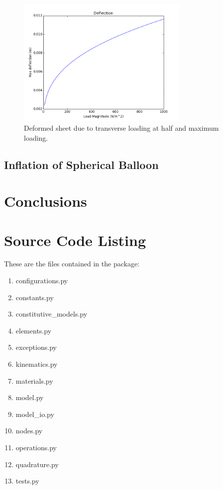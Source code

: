 \documentclass[]{spie}  %
\begin{document}
\begin{figure}[h]
	\centering
	\includegraphics[width=3.25in]{load_vs_deflection.png}
	\caption{Deformed sheet due to transverse loading at half and maximum loading.} 
	\label{fig: load vs deflection}
\end{figure}

\subsection{Inflation of Spherical Balloon}



\section{Conclusions}








	
\section{Source Code Listing}
These are the files contained in the package:
\begin{enumerate}
	\item configurations.py
	\item constants.py
	\item constitutive\_models.py
	\item elements.py
	\item exceptions.py
	\item kinematics.py
	\item materials.py 
	\item model.py
	\item model\_io.py
	\item nodes.py
	\item operations.py
	\item quadrature.py
	\item tests.py
\end{enumerate}
\end{document}
